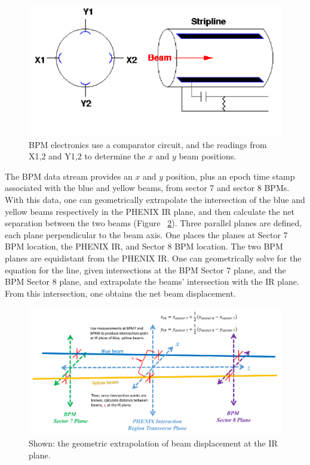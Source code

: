 \begin{figure}[ht]
  \begin{center}
    \includegraphics[width=1.0\linewidth]{./figures/bpm_schematic}
    \caption{ 
      BPM electronics use a comparator circuit, and the readings from X{1,2} and
      Y{1,2} to determine the $x$ and $y$ beam positions. 
    }
    \label{fig:bpm_schematic_cartoon}
  \end{center}
\end{figure}

The BPM data stream provides an $x$ and $y$ position, plus an epoch time stamp
associated with the blue and yellow beams, from sector 7 and sector 8 BPMs.
With this data, one can geometrically extrapolate the intersection of the blue
and yellow beams respectively in the PHENIX IR plane, and then calculate the net
separation between the two beams (Figure ~\ref{fig:bpm_ir_xing_cartoon}).  Three
parallel planes are defined, each plane perpendicular to the beam axis.  One
places the planes at Sector 7 BPM location, the PHENIX IR, and Sector 8 BPM
location.  The two BPM planes are equidistant from the PHENIX IR. One can
geometrically solve for the equation for the line, given intersections at the
BPM Sector 7 plane, and the BPM Sector 8 plane, and extrapolate the beams'
intersection with the IR plane. From this intersection, one obtains the net beam
displacement.

\begin{figure}[ht]
\begin{center}
\includegraphics[width=1.0\linewidth]{./figures/bpm_ir_beam_separation}
\caption{
  Shown: the geometric extrapolation of beam displacement at the IR plane.
}
\label{fig:bpm_ir_xing_cartoon}
\end{center}
\end{figure}


